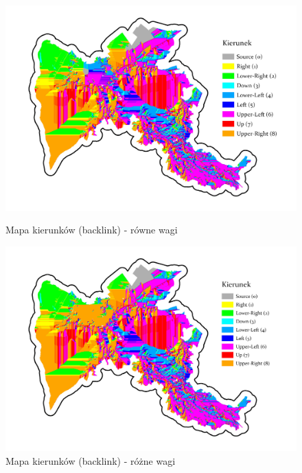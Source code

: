 \documentclass{article}
\begin{document}
\begin{figure}[H]
    \begin{minipage}[t]{0.48\textwidth}
        \centering
        \includegraphics[width=\linewidth]{img/cost-backlink.jpg}
        \caption{Mapa kierunków (backlink) - równe wagi}
        \label{fig:backlink-rowne}
    \end{minipage}
    \hfill
    \begin{minipage}[t]{0.48\textwidth}
        \centering
        \includegraphics[width=\linewidth]{img/roznewagi-cost-backlink.jpg}
        \caption{Mapa kierunków (backlink) - różne wagi}
        \label{fig:backlink-rozne}
    \end{minipage}
\end{figure}
\end{document}
